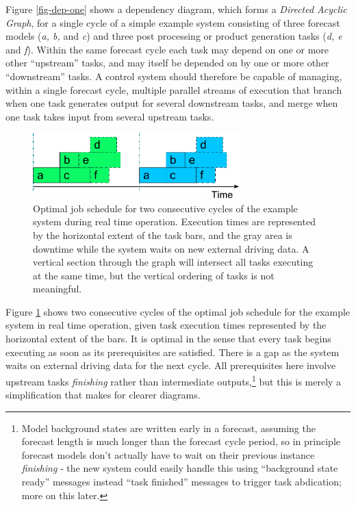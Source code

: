 \documentclass[11pt,a4paper]{article}
\begin{document}
Figure \ref{fig-dep-one} shows a dependency diagram, which forms a
{\em Directed Acyclic Graph}, for a single cycle of a simple example
system consisting of three forecast models ({\em a, b,} and {\em c}) and
three post processing or product generation tasks ({\em d, e} and {\em
f}).  Within the same forecast cycle each task may depend on one or
more other ``upstream'' tasks, and may itself be depended on by one or
more other ``downstream'' tasks.  A control system should therefore be
capable of managing, within a single forecast cycle, multiple parallel
streams of execution that branch when one task generates output for
several downstream tasks, and merge when one task takes input from
several upstream tasks. 

\begin{figure}
    \begin{center}
        \includegraphics[width=8cm]{timeline-one}
    \end{center}
    \caption{\small Optimal job schedule for two consecutive cycles of
    the example system during real time operation. Execution times are
    represented by the horizontal extent of the task bars, and the gray
    area is downtime while the system waits on new external driving
    data.  A vertical section through the graph will intersect all tasks
    executing at the same time, but the vertical ordering of tasks is
    not meaningful.}
    \label{fig-time-one}
\end{figure}

Figure \ref{fig-time-one} shows two consecutive cycles of the optimal
job schedule for the example system in real time operation, given task
execution times represented by the horizontal extent of the bars. It is
optimal in the sense that every task begins executing as soon as its
prerequisites are satisfied. There is a gap as the system waits on
external driving data for the next cycle.  All prerequisites here
involve upstream tasks {\em finishing} rather than intermediate
outputs,\footnote{Model background states are written early in a
forecast, assuming the forecast length is much longer than the forecast
cycle period, so in principle forecast models don't actually have to
wait on their previous instance {\em finishing} - the new system could
easily handle this using ``background state ready'' messages instead 
``task finished'' messages to trigger task abdication; more on this
later.} but this is merely a simplification that makes for clearer
diagrams.  
\end{document}
